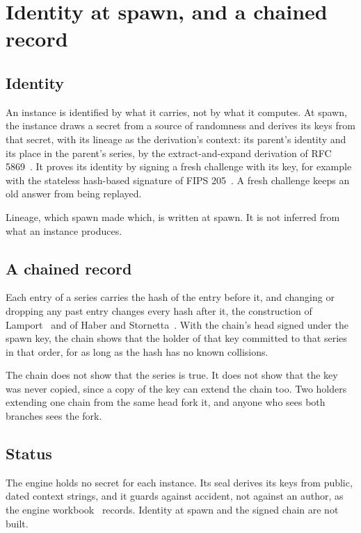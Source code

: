 \chapter{\texorpdfstring{Identity at spawn, and a chained record}{Identity at spawn, and a chained record}}
\label{chap:identity}

\section{\texorpdfstring{Identity}{Identity}}

An instance is identified by what it carries, not by what it computes. At spawn, the instance draws a secret from a source of randomness and derives its keys from that secret, with its lineage as the derivation's context: its parent's identity and its place in the parent's series, by the extract-and-expand derivation of RFC 5869~\cite{src:RFC5869}. It proves its identity by signing a fresh challenge with its key, for example with the stateless hash-based signature of FIPS 205~\cite{src:FIPS-205}. A fresh challenge keeps an old answer from being replayed.

Lineage, which spawn made which, is written at spawn. It is not inferred from what an instance produces.

\section{\texorpdfstring{A chained record}{A chained record}}

Each entry of a series carries the hash of the entry before it, and changing or dropping any past entry changes every hash after it, the construction of Lamport~\cite{src:Lamport-1981} and of Haber and Stornetta~\cite{src:Haber-Stornetta-1991}. With the chain's head signed under the spawn key, the chain shows that the holder of that key committed to that series in that order, for as long as the hash has no known collisions.

The chain does not show that the series is true. It does not show that the key was never copied, since a copy of the key can extend the chain too. Two holders extending one chain from the same head fork it, and anyone who sees both branches sees the fork.

\section{\texorpdfstring{Status}{Status}}

The engine holds no secret for each instance. Its seal derives its keys from public, dated context strings, and it guards against accident, not against an author, as the engine workbook~\cite{src:Quigg-engine-workbook} records. Identity at spawn and the signed chain are not built.
